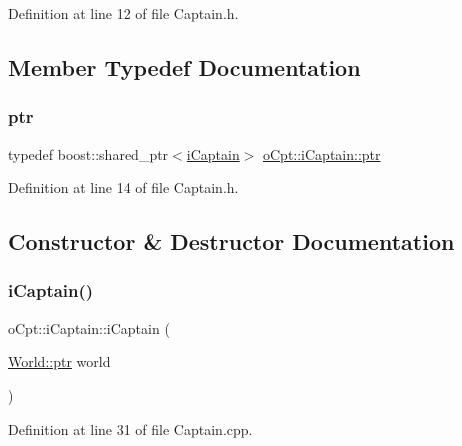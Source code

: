 Definition at line 12 of file Captain.\+h.



\subsection{Member Typedef Documentation}
\hypertarget{classo_cpt_1_1i_captain_ae1595d808fa14777c26f1227a82ac4f5}{}\label{classo_cpt_1_1i_captain_ae1595d808fa14777c26f1227a82ac4f5} 
\subsubsection{\texorpdfstring{ptr}{ptr}}
{\footnotesize\ttfamily typedef boost\+::shared\+\_\+ptr$<$\hyperlink{classo_cpt_1_1i_captain}{i\+Captain}$>$ \hyperlink{classo_cpt_1_1i_captain_ae1595d808fa14777c26f1227a82ac4f5}{o\+Cpt\+::i\+Captain\+::ptr}}



Definition at line 14 of file Captain.\+h.



\subsection{Constructor \& Destructor Documentation}
\hypertarget{classo_cpt_1_1i_captain_a23cd0cb920d48da605e9c8266e6448a9}{}\label{classo_cpt_1_1i_captain_a23cd0cb920d48da605e9c8266e6448a9} 
\subsubsection{\texorpdfstring{i\+Captain()}{iCaptain()}}
{\footnotesize\ttfamily o\+Cpt\+::i\+Captain\+::i\+Captain (\begin{DoxyParamCaption}\item[{\hyperlink{classo_cpt_1_1_world_aa6e591e3096d5de71e0cec9039663d67}{World\+::ptr}}]{world }\end{DoxyParamCaption})}



Definition at line 31 of file Captain.\+cpp.

\hypertarget{classo_cpt_1_1i_captain_a32e37b6a4952f59c1b315d54bf84bb3f}{}\label{classo_cpt_1_1i_captain_a32e37b6a4952f59c1b315d54bf84bb3f} 
